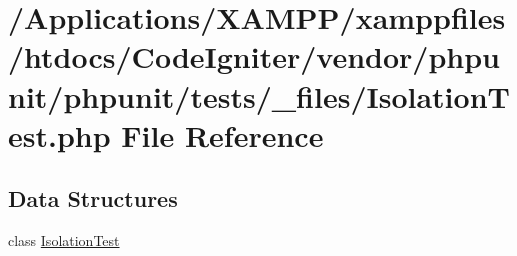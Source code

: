 \hypertarget{_isolation_test_8php}{}\section{/\+Applications/\+X\+A\+M\+P\+P/xamppfiles/htdocs/\+Code\+Igniter/vendor/phpunit/phpunit/tests/\+\_\+files/\+Isolation\+Test.php File Reference}
\label{_isolation_test_8php}
\subsection*{Data Structures}
\begin{DoxyCompactItemize}
\item 
class \mbox{\hyperlink{class_isolation_test}{Isolation\+Test}}
\end{DoxyCompactItemize}
